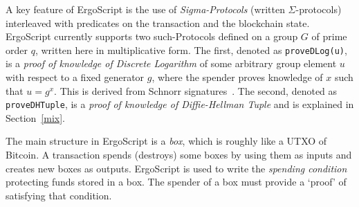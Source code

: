 \documentclass[11pt]{article}
\newcommand{\langname}{ErgoScript\xspace}
\begin{document}
A key feature of \langname is the use of {\em Sigma-Protocols} (written $\Sigma$-protocols)\cite{Dam10} interleaved with predicates on the transaction and the blockchain state. \langname currently supports two such-Protocols defined on a group $G$ of prime order $q$, written here in multiplicative form. 
The first, denoted as \texttt{proveDLog(u)}, is a {\em proof of knowledge of Discrete Logarithm} of some arbitrary group element $u$ with respect to a fixed generator $g$, where the spender proves knowledge of $x$ such that $u = g^x$.
This is derived from Schnorr signatures~\cite{Sch91}. The second, denoted as \texttt{proveDHTuple}, is a {\em proof of knowledge of Diffie-Hellman Tuple} and is explained in Section~\ref{mix}.


The main structure in \langname is a \emph{box}, which is roughly like a UTXO of Bitcoin. A transaction spends (destroys) some boxes by using them as inputs and creates new boxes as outputs.  \langname is used to write the {\em spending condition} protecting funds stored in a box. The spender of a box must provide a `proof' of satisfying that condition. 



\end{document}
